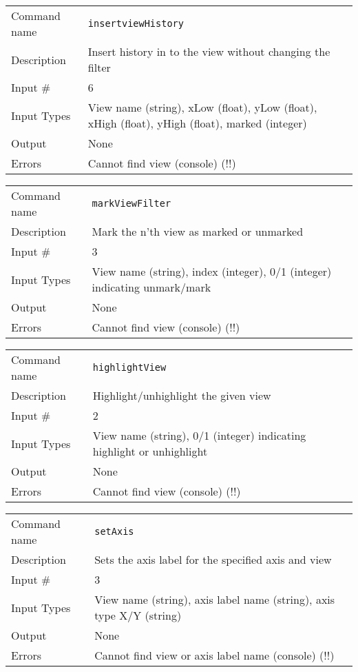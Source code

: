 \bigskip

\noindent
\begin{tabular}{l|p{5in}}
\hline
Command name & {\tt insertviewHistory} \\
Description  & Insert history in to the view without changing the filter \\
Input \#     & 6 \\
Input Types  & View name (string), xLow (float), yLow (float), xHigh (float),
               yHigh (float), marked (integer) \\
Output       & None \\
Errors       & Cannot find view (console) (!!) \\
\hline
\end{tabular}

\bigskip

\noindent
\begin{tabular}{l|p{5in}}
\hline
Command name & {\tt markViewFilter} \\
Description  & Mark the n'th view as marked or unmarked \\
Input \#     & 3 \\
Input Types  & View name (string), index (integer),
               0/1 (integer) indicating unmark/mark \\
Output       & None \\
Errors       & Cannot find view (console) (!!) \\
\hline
\end{tabular}

\bigskip

\noindent
\begin{tabular}{l|p{5in}}
\hline
Command name & {\tt highlightView} \\
Description  & Highlight/unhighlight the given view \\
Input \#     & 2 \\
Input Types  & View name (string), 0/1 (integer) indicating highlight
               or unhighlight \\
Output       & None \\
Errors       & Cannot find view (console) (!!) \\
\hline
\end{tabular}

\bigskip

\noindent
\begin{tabular}{l|p{5in}}
\hline
Command name & {\tt setAxis} \\
Description  & Sets the axis label for the specified axis and view \\
Input \#     & 3 \\
Input Types  & View name (string), axis label name (string),
               axis type X/Y (string) \\
Output       & None \\
Errors       & Cannot find view or axis label name (console) (!!) \\
\hline
\end{tabular}

